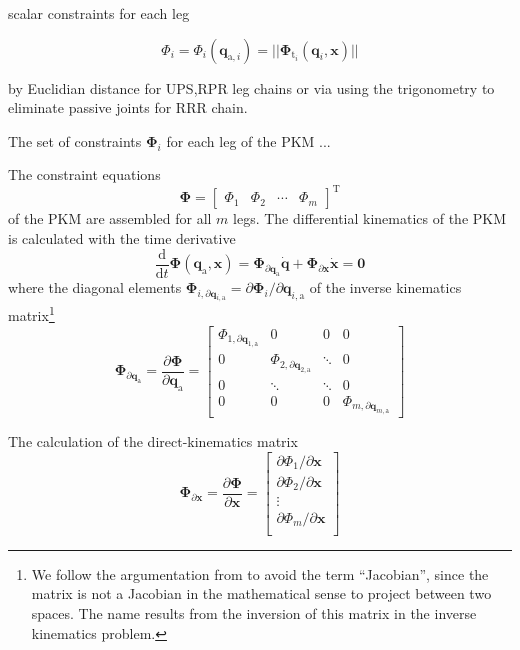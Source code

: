 \documentclass[robotics,article,submit,moreauthors,pdftex]{Definitions/mdpi}
\newcommand{\bm}[1]{\boldsymbol{#1}}
\newcommand{\transp}[0]{{\mathrm{T}}}
\begin{document}
scalar constraints for each leg

\begin{equation}
\Phi_{i}
=
\Phi_{i}(\bm{q}_{\mathrm{a},i})
=
||\bm{\Phi}_{\mathrm{t}_i}(\bm{q}_i,\bm{x})||
\end{equation}

by Euclidian distance for UPS,RPR leg chains or via using the trigonometry to eliminate passive joints for RRR chain.


The set of constraints $\bm{\Phi}_{i}$ for each leg of the PKM ...

The constraint equations
%
\begin{equation}
\bm{\Phi}
=
\begin{bmatrix}
\Phi_1 & \Phi_2 & \cdots & \Phi_m
\end{bmatrix}^\transp
\end{equation}
%
of the PKM are assembled for all $m$ legs.
The differential kinematics of the PKM is calculated with the time derivative
%
\begin{equation}
\frac{\mathrm{d}}{{\mathrm{d}}t} \bm{\Phi}(\bm{q}_\mathrm{a},\bm{x})
=
\bm{\Phi}_{\partial \bm{q}_\mathrm{a}}  \dot{\bm{q}}
+
\bm{\Phi}_{\partial \bm{x}} \dot{\bm{x}}
=
\bm{0}
\end{equation}
%
where the diagonal elements $\bm{\Phi}_{i,\partial \bm{q}_{i,\mathrm{a}}}=\partial \bm{\Phi}_i / \partial \bm{q}_{i,\mathrm{a}}$ of the inverse kinematics matrix\footnote{We follow the argumentation from \cite{Gogu2008} to avoid the term ``Jacobian'', since the matrix is not a Jacobian in the mathematical sense to project between two spaces. The name results from the inversion of this matrix in the inverse kinematics problem.}
%
\begin{equation}
\bm{\Phi}_{\partial \bm{q}_{\mathrm{a}}}
=
\frac{\partial \bm{\Phi}}{\partial \bm{q}_{\mathrm{a}}}
=
\begin{bmatrix}
\Phi_{1,\partial \bm{q}_{1,\mathrm{a}}}  & 0 & 0 & 0\\
0 & \Phi_{2,\partial \bm{q}_{2,\mathrm{a}}} & \ddots & 0  \\
0 & \ddots & \ddots & 0  \\
0 & 0 & 0 & \Phi_{m,\partial \bm{q}_{m,\mathrm{a}}}
\end{bmatrix}
\label{equ:PKM_phi_grad_q}
\end{equation}  

The calculation of the direct-kinematics matrix
%
\begin{equation}
\bm{\Phi}_{\partial \bm{x}}
=
\frac{\partial \bm{\Phi}}{\partial \bm{x}}
=
\begin{bmatrix}
\partial \Phi_1/\partial \bm{x}\\
\partial \Phi_2/\partial \bm{x}\\
\vdots \\
\partial \Phi_m/\partial \bm{x}\\
\end{bmatrix}
\label{equ:PKM_phi_grad_x}
\end{equation}
\end{document}
